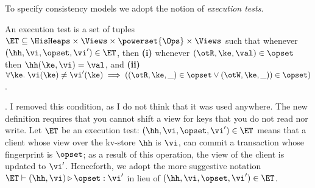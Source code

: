 To specify consistency models we adopt the notion of \emph{execution tests}. 
\begin{definition}
\label{def:execution.test}
An execution test is a set of tuples $\ET \subseteq \HisHeaps \times \Views \times \powerset{\Ops} \times \Views$ 
such that whenever $(\hh, \vi, \opset, \vi') \in \ET$, then 
\textbf{(i)} whenever $(\otR, \ke, \val) \in \opset$ then $\hh(\ke, \vi) = \val$, 
and \textbf{(ii)}  $\forall \ke. \; \vi(\ke) \neq \vi'(\ke) \implies ( (\otR, \ke, \_) \in \opset \vee (\otW, \ke, \_)) \in \opset)$.
\end{definition}
.
\ac{I removed this condition, as I do not think that it was used anywhere. The new definition requires that 
you cannot shift a view for keys that you do not read nor write.}
Let $\ET$ be an execution test: $(\hh, \vi, \opset, \vi') \in \ET$ means 
that a client whose view over the kv-store $\hh$ is $\vi$, can commit a 
transaction whose fingerprint is $\opset$; as a result of this operation, the 
view of the client is updated to $\vi'$. Henceforth, we adopt the 
more suggestive notation $\ET \vdash (\hh, \vi) \triangleright \opset: \vi'$ 
in lieu of $(\hh, \vi, \opset, \vi') \in \ET$.
